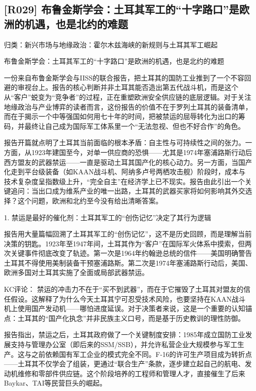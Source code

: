 \documentclass[11pt]{ctexart}
\begin{document}
\subsection{[R029] 布鲁金斯学会：土耳其军工的“十字路口”是欧洲的机遇，也是北约的难题}
{\small\color{refgray}归类：新兴市场与地缘政治：霍尔木兹海峡的新规则与土耳其军工崛起}

布鲁金斯学会：土耳其军工的“十字路口”是欧洲的机遇，也是北约的难题

一份来自布鲁金斯学会与IISS的联合报告，把土耳其的国防工业推到了一个不容回避的审视台上。报告的核心判断并非土耳其能否造出第五代战斗机，而是这个从“客户”蜕变为“竞争者”的过程，正在重塑欧洲安全供应链的底层逻辑。对于关注地缘政治与产业博弈的读者而言，这份报告的价值不在于罗列土耳其的装备清单，而在于揭示一个中等强国如何用七十年的时间，把被禁运的屈辱转化为出口的筹码，并最终让自己成为国际军工体系里一个“无法忽视、但也不好合作”的角色。

报告开篇就点明了土耳其当前面临的根本矛盾：自主性与可持续性之间的张力。一方面，从1923年建国至今，对单一供应商的恐惧——尤其是1974年塞浦路斯行动后西方盟友的武器禁运——一直是驱动土耳其国产化的核心动力。另一方面，当国产化走到平台级装备（如KAAN战斗机、阿纳多卢号两栖攻击舰）阶段时，成本与技术复杂度呈指数级上升，“完全自主”在经济学上已不现实。报告由此引出一个关键追问：当出口成为维系产业的唯一出路，土耳其的武器买家将如何影响其外交选择？这个问题，欧洲和北约至今没有给出清晰答案。

1. 禁运是最好的催化剂：土耳其军工的“创伤记忆”决定了其行为逻辑

报告用大量篇幅回溯了土耳其军工的“创伤记忆”，这不是历史回顾，而是理解当前决策的钥匙。1923年至1947年间，土耳其作为“客户”在国际军火体系中摸索，但两次关键事件彻底改变了轨迹。第一次是1964年约翰逊总统的信件——美国明确警告土耳其不得使用美制装备干预塞浦路斯。第二次是1974年塞浦路斯行动后，美国、欧洲多国对土耳其实施了全面或局部武器禁运。

KC评论： 禁运的冲击力不在于“买不到武器”，而在于它摧毁了土耳其对盟友的信任假设。这解释了为什么今天土耳其宁可忍受技术风险，也要坚持在KAAN战斗机上使用国产发动机——哪怕进度延误。对于决策者来说，这是一个重要的认知锚点：土耳其的“国产化执念”并非民族主义口号，而是基于历史教训的理性防御。

报告指出，禁运之后，土耳其政府做了一个关键制度安排：1985年成立国防工业发展支持与管理办公室（即后来的SSM/SSB），并允许私营企业大规模参与军工生产。这与之前依赖国有军工企业的模式完全不同。F-16的许可生产项目成为转折点——土耳其不仅学会了组装，更通过“联合生产”条款，逐步建立起自己的航电、发动机维修和零部件供应链。这个阶段培养的工程师和管理人才，直接催生了后来Baykar、TAI等民营巨头的崛起。
\end{document}
